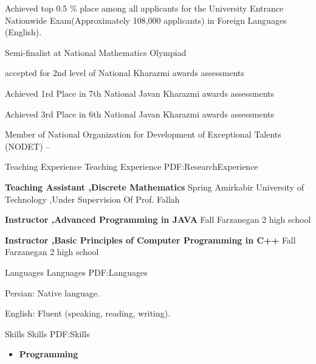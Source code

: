 \documentclass[letterpaper,MMMyyyy,nonstopmode]{simpleresumecv}
\begin{document}
\begin{Body}
\Gap
\BulletItem
Achieved top 0.5 \% place among all applicants for the University Entrance Nationwide
Exam(Approximately 108,000 applicants) in Foreign Languages (English).
\hfill
{}

\Gap
\BulletItem
Semi-finalist at National Mathematics Olympiad
\hfill
{}


\Gap
\BulletItem
accepted for 2nd level of National Kharazmi awards assessments
\hfill
{}


\Gap
\BulletItem
Achieved 1rd Place in 7th National Javan Kharazmi awards assessments
\hfill
{}


\Gap
\BulletItem
Achieved 3rd Place in 6th National Javan Kharazmi awards assessments
\hfill
{}

\Gap
\BulletItem
 Member of National Organization for Development of Exceptional  Talents (NODET)
 \hfill
{} --


\Section
{Teaching Experience}
{Teaching Experience}
{PDF:ResearchExperience}

\Entry

\textbf{Teaching Assistant ,Discrete Mathematics}
\hfill
Spring 
\newline Amirkabir University of Technology ,Under Supervision Of Prof. Fallah


\Entry
\textbf{Instructor ,Advanced Programming in JAVA }
\hfill
Fall 
\newline Farzanegan 2 high school 

\Entry
\textbf{Instructor ,Basic Principles of Computer Programming in C++ }
\hfill
Fall 
\newline Farzanegan 2 high school 



\Section
{Languages}
{Languages}
{PDF:Languages}

\BulletItem
Persian: Native language.

\Gap
\BulletItem
English: Fluent (speaking, reading, writing).



\Section
{Skills}
{Skills}
{PDF:Skills}

\Entry

\begin{itemize}
\item {\textbf{Programming}}


\end{itemize}
\end{Body}
\end{document}
